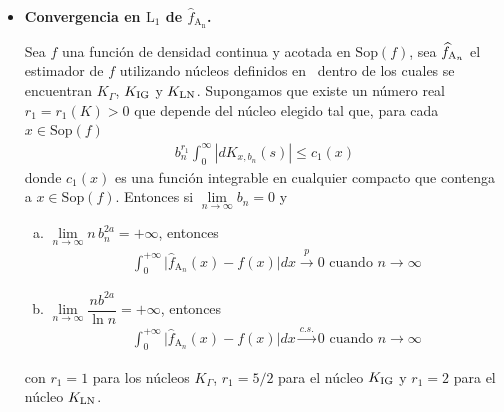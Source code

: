 \begin{itemize}


\item \textbf{Convergencia en $\text{L}_1$ de $\widehat{f}_{\text{A}_\text{n}}$.}

\begin{theorem}
	\bigskip
	Sea $f$ una función de densidad continua y acotada en $\mathrm{Sop}(f)$, sea $\widehat{f}_{\tiny \text{A}_n}$ el estimador de $f$ utilizando núcleos definidos en~\cite{Libnegue2013} dentro de los cuales se encuentran $K_{\Gamma}$, $K_{\tiny \text{IG}}$ y $K_{\tiny \text{LN}}$. Supongamos que existe un número real $r_1=r_1(K)>0$ que depende del núcleo elegido tal que, para cada $x \in \mathrm{Sop}(f)$ 
	\begin{align}
	b_n^{r_1} \displaystyle{\int_0^{\infty}} | dK_{x,b_n}(s) | \leq c_1(x)
	\end{align}
	donde $c_1(x)$ es una función integrable en cualquier compacto que contenga a $x \in \mathrm{Sop}(f)$. Entonces si $\lim\limits_{n \rightarrow \infty} b_n=0 $ y
	\begin{enumerate}[a)]
		\item $\lim\limits_{n \rightarrow \infty} n \, b_n^{2a}=+\infty$,  entonces
		\begin{align}
		\int_0^{+\infty} \vert \widehat{f}_{\text{A}_n}(x)-f(x)\vert dx \stackrel{p} {\longrightarrow} 0 \text{ cuando } n \longrightarrow \infty
		\label{L1debil}
		\end{align}
		\item $\lim\limits_{n \to \infty} \dfrac{n b^{2a}}{\ln{n}}  = +\infty $, entonces 
		\begin{align}
		\int_0^{+\infty} \vert \widehat{f}_{\text{A}_n}(x)-f(x)\vert dx \stackrel{c.s.} {\longrightarrow} 0 \text{ cuando } n \longrightarrow \infty
		\label{L1fuerte}
		\end{align}
	\end{enumerate}
	con $r_1=1$ para los núcleos $K_{\Gamma}$, $r_1=5/2$ para el núcleo $K_{\tiny \text{IG}}$ y $r_1=2$ para el núcleo $K_{\tiny \text{LN}}$.
\end{theorem}




\end{itemize}
